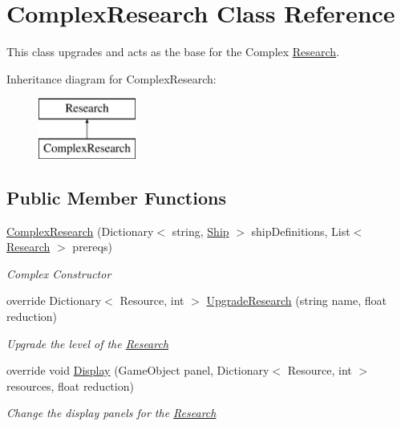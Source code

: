 \hypertarget{class_complex_research}{}\section{Complex\+Research Class Reference}
\label{class_complex_research}


This class upgrades and acts as the base for the Complex \hyperlink{class_research}{Research}.  


Inheritance diagram for Complex\+Research\+:\begin{figure}[H]
\begin{center}
\leavevmode
\includegraphics[height=2.000000cm]{class_complex_research}
\end{center}
\end{figure}
\subsection*{Public Member Functions}
\begin{DoxyCompactItemize}
\item 
\hyperlink{class_complex_research_a73ede9de51ab0cb571831aac26c26a20}{Complex\+Research} (Dictionary$<$ string, \hyperlink{class_ship}{Ship} $>$ ship\+Definitions, List$<$ \hyperlink{class_research}{Research} $>$ prereqs)
\begin{DoxyCompactList}\small\item\em Complex Constructor \end{DoxyCompactList}\item 
override Dictionary$<$ Resource, int $>$ \hyperlink{class_complex_research_a310412a49ffc06dfc21b7bb9777199d1}{Upgrade\+Research} (string name, float reduction)
\begin{DoxyCompactList}\small\item\em Upgrade the level of the \hyperlink{class_research}{Research} \end{DoxyCompactList}\item 
override void \hyperlink{class_complex_research_a038a03231a819764dc9d2ee7a55233e6}{Display} (Game\+Object panel, Dictionary$<$ Resource, int $>$ resources, float reduction)
\begin{DoxyCompactList}\small\item\em Change the display panels for the \hyperlink{class_research}{Research} \end{DoxyCompactList}\end{DoxyCompactItemize}
